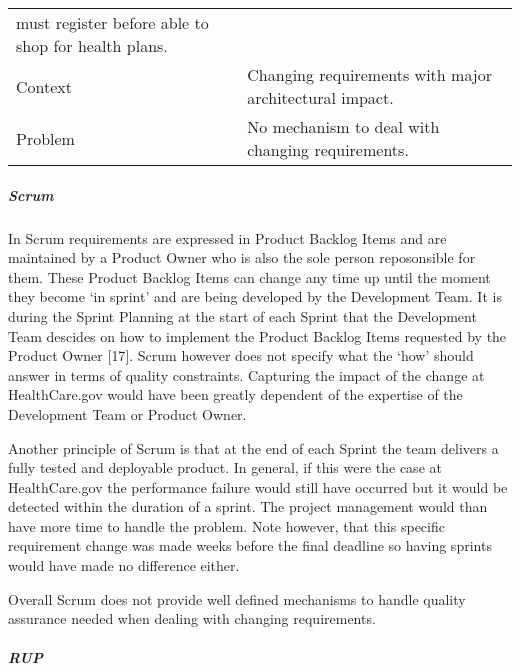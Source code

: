 \documentclass[]{article}
\let\oldsubparagraph\subparagraph
\renewcommand{\subparagraph}[1]{\oldsubparagraph{#1}\mbox{}}
\begin{document}
\begin{longtable}[c]{@{}ll@{}}
\begin{minipage}[t]{0.85\columnwidth}
must register before able to shop for health plans.
\strut\end{minipage}\tabularnewline
\begin{minipage}[t]{0.09\columnwidth}\raggedright\strut
Context
\strut\end{minipage} &
\begin{minipage}[t]{0.85\columnwidth}\raggedright\strut
Changing requirements with major architectural impact.
\strut\end{minipage}\tabularnewline
\begin{minipage}[t]{0.09\columnwidth}\raggedright\strut
Problem
\strut\end{minipage} &
\begin{minipage}[t]{0.85\columnwidth}\raggedright\strut
No mechanism to deal with changing requirements.
\strut\end{minipage}\tabularnewline
\bottomrule
\end{longtable}

\subparagraph{Scrum}\label{scrum-2}

In Scrum requirements are expressed in Product Backlog Items and are
maintained by a Product Owner who is also the sole person reposonsible
for them. These Product Backlog Items can change any time up until the
moment they become `in sprint' and are being developed by the
Development Team. It is during the Sprint Planning at the start of each
Sprint that the Development Team descides on how to implement the
Product Backlog Items requested by the Product Owner {[}17{]}. Scrum
however does not specify what the `how' should answer in terms of
quality constraints. Capturing the impact of the change at
HealthCare.gov would have been greatly dependent of the expertise of the
Development Team or Product Owner.

Another principle of Scrum is that at the end of each Sprint the team
delivers a fully tested and deployable product. In general, if this were
the case at HealthCare.gov the performance failure would still have
occurred but it would be detected within the duration of a sprint. The
project management would than have more time to handle the problem. Note
however, that this specific requirement change was made weeks before the
final deadline so having sprints would have made no difference either.

Overall Scrum does not provide well defined mechanisms to handle quality
assurance needed when dealing with changing requirements.

\subparagraph{RUP}\label{rup-1}
\end{document}
